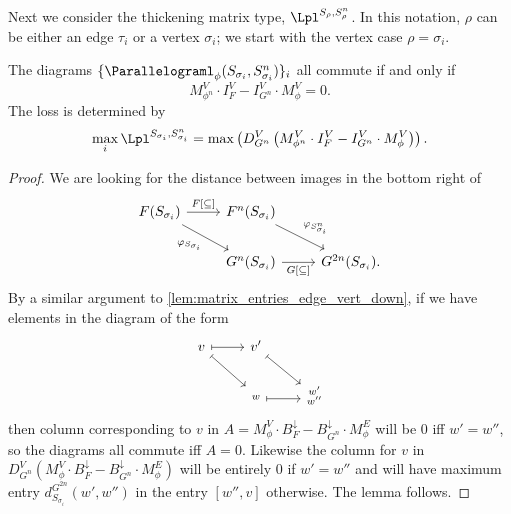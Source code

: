 %
%
%

Next we consider the thickening matrix type, $\Lpl^{S_\rho, S_\rho^n}$. In this notation, $\rho$ can be either an edge $\tau_i$ or a vertex $\sigma_i$; we start with the vertex case $\rho = \sigma_i$. 

\begin{lemma}
\label{lem:matrix_entries_parallel_thickening}
The diagrams $\{\Parallelograml_\phi(S_{\sigma_i},S_{\sigma_i}^n)\}_i$ all commute if and only if 
\begin{equation*}
M_{\phi^n}^V \cdot I_F^V - I_{G^n}^V \cdot M_{\phi}^V= 0.
\end{equation*}
The loss is determined by
\begin{equation*}
\max_{i} \Lpl^{S_{\sigma_{i}},S_{\sigma_{i}}^n} = \max \left(D_{G^n}^V \left(M_{\phi^n}^V \cdot I_F^V - I_{G^n}^V \cdot M_{\phi}^V\right) \right).
\end{equation*}
\end{lemma}

\begin{proof} %
We are looking for the distance between images in the bottom right of 
\begin{equation*}
\begin{tikzcd}
F(S_{\sigma_i})  
    \ar[r, "{F[\subseteq ]}"] 
    \ar[dr, "{\varphi_{S_{\sigma_i}}}"']
& F^n(S_{\sigma_i})
    \ar[dr, "{\varphi_{ S_{\sigma_i}^n}}"]
& \\
& G^n(S_{\sigma_i}) 
    \ar[r, "{G[\subseteq ]}"'] 
& G^{2n}(S_{\sigma_i})  .
\end{tikzcd}
\end{equation*} 
By a similar argument to \cref{lem:matrix_entries_edge_vert_down}, if we have elements in the diagram of the form
\begin{equation*}
\begin{tikzcd}
v \ar[r, mapsto] \ar[dr, mapsto] & v' \ar[dr, mapsto]\\ 
& \substack{\\w} \ar[r, mapsto, shift right] & \substack{w'\\w''}
\end{tikzcd}
\end{equation*}
then column corresponding to $v$ in  $A = M_{\phi}^V \cdot B_F^{\downarrow} - B_{G^n}^{\downarrow} \cdot M_{\phi}^E$ will be 0 iff $w'=w''$, so the diagrams all commute iff $A = 0$. 
Likewise the column for $v$ in  
$D_{G^n}^V \left(M_{\phi}^V \cdot B_F^{\downarrow} - B_{G^n}^{\downarrow} \cdot M_{\phi}^E\right)$ 
will be entirely 0 if $w' = w''$ and will have maximum entry $d^{G^{2n}}_{S_{\sigma_i}}(w', w'')$ in the entry $[w'',v]$ otherwise. 
The lemma follows.
%
%
%
%
\end{proof}

